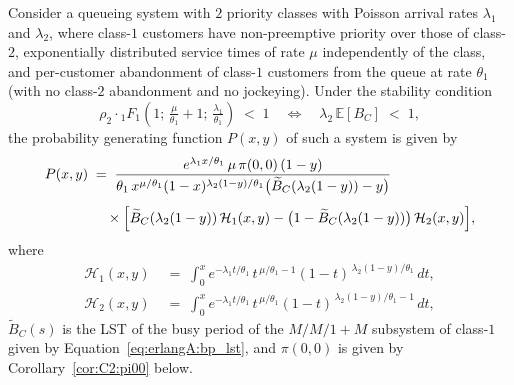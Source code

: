 \begin{theorem}
    Consider a queueing system with $2$ priority classes with Poisson arrival rates $\lambda_1$ and $\lambda_2$, where class-$1$ customers have non-preemptive priority over those of class-$2$, exponentially distributed service times of rate $\mu$ independently of the class, and per-customer abandonment of class-$1$ customers from the queue at rate $\theta_1$ (with no class-$2$ abandonment and no jockeying). Under the stability condition
    \begin{equation}
        \rho_2\cdot{}_1F_1\!\left(1;\,\tfrac{\mu}{\theta_1}+1;\,\tfrac{\lambda_1}{\theta_1}\right) \;<\; 1
        \quad\Longleftrightarrow\quad
        \lambda_2\,\mathbb{E}[B_C] \;<\; 1,
    \end{equation}
    the probability generating function $P(x,y)$ of such a system is given by
    \begin{align}
        \begin{split}
            P(x,y) \;&=\; \frac{e^{\lambda_1 x/\theta_1}\,\mu\,\pi(0,0)\,(1-y)}{\theta_1\, x^{\mu/\theta_1}(1-x)^{\lambda_2(1-y)/\theta_1}\bigl(\widetilde{B}_C(\lambda_2(1-y))-y\bigr)}\\[4pt]
            &\quad\times \Bigl[\widetilde{B}_C(\lambda_2(1-y))\,\mathcal{H}_1(x,y) - \bigl(1-\widetilde{B}_C(\lambda_2(1-y))\bigr)\,\mathcal{H}_2(x,y)\Bigr],
        \end{split}
    \end{align}
    where
    \begin{align*}
        \mathcal{H}_1(x,y) &\;=\; \int_0^x e^{-\lambda_1 t/\theta_1}\,t^{\,\mu/\theta_1-1}(1-t)^{\,\lambda_2(1-y)/\theta_1}\,dt, \\
        \mathcal{H}_2(x,y) &\;=\; \int_0^x e^{-\lambda_1 t/\theta_1}\,t^{\,\mu/\theta_1}(1-t)^{\,\lambda_2(1-y)/\theta_1-1}\,dt,
    \end{align*}
    $\widetilde{B}_C(s)$ is the LST of the busy period of the $M/M/1+M$ subsystem of class-$1$ given by Equation~\eqref{eq:erlangA:bp_lst}, and $\pi(0,0)$ is given by Corollary~\ref{cor:C2:pi00} below.
\end{theorem}

